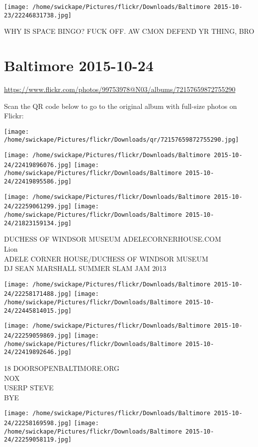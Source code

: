 \documentclass[10pt,letterpaper]{article}
\begin{document}
\texttt{[image: /home/swickape/Pictures/flickr/Downloads/Baltimore 2015-10-23/22246831738.jpg]}

WHY IS SPACE BINGO?  FUCK OFF.  AW CMON DEFEND YR THING, BRO
\pagebreak

\section*{Baltimore 2015-10-24}

\url{https://www.flickr.com/photos/99753978@N03/albums/72157659872755290}

Scan the QR code below to go to the original album with full-size photos on Flickr:

\texttt{[image: /home/swickape/Pictures/flickr/Downloads/qr/72157659872755290.jpg]}
\pagebreak

\texttt{[image: /home/swickape/Pictures/flickr/Downloads/Baltimore 2015-10-24/22419896076.jpg]}
\texttt{[image: /home/swickape/Pictures/flickr/Downloads/Baltimore 2015-10-24/22419895586.jpg]}

\texttt{[image: /home/swickape/Pictures/flickr/Downloads/Baltimore 2015-10-24/22259061299.jpg]}
\texttt{[image: /home/swickape/Pictures/flickr/Downloads/Baltimore 2015-10-24/21823159134.jpg]}

DUCHESS OF WINDSOR MUSEUM ADELECORNERHOUSE.COM\\
Lion\\
ADELE CORNER HOUSE/DUCHESS OF WINDSOR MUSEUM\\
DJ SEAN MARSHALL SUMMER SLAM JAM 2013
\pagebreak

\texttt{[image: /home/swickape/Pictures/flickr/Downloads/Baltimore 2015-10-24/22258171488.jpg]}
\texttt{[image: /home/swickape/Pictures/flickr/Downloads/Baltimore 2015-10-24/22445814015.jpg]}

\texttt{[image: /home/swickape/Pictures/flickr/Downloads/Baltimore 2015-10-24/22259059869.jpg]}
\texttt{[image: /home/swickape/Pictures/flickr/Downloads/Baltimore 2015-10-24/22419892646.jpg]}

18 DOORSOPENBALTIMORE.ORG\\
NOX\\
USERP STEVE\\
BYE
\pagebreak

\texttt{[image: /home/swickape/Pictures/flickr/Downloads/Baltimore 2015-10-24/22258169598.jpg]}
\texttt{[image: /home/swickape/Pictures/flickr/Downloads/Baltimore 2015-10-24/22259058119.jpg]}
\end{document}
